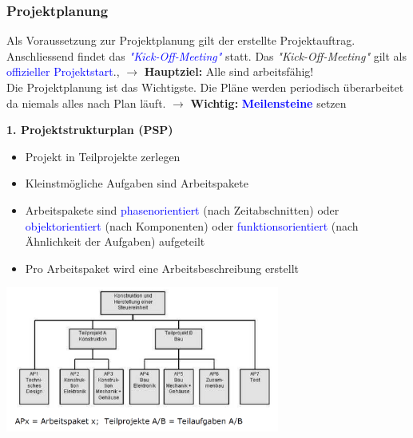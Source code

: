 \subsubsection{Projektplanung}
Als Voraussetzung zur Projektplanung gilt der erstellte Projektauftrag. Anschliessend findet das \textcolor{blue}{\textit{"Kick-Off-Meeting"}} statt. \newline Das \textit{"Kick-Off-Meeting"} gilt als \textcolor{blue}{offizieller Projektstart}., $\rightarrow$ \textbf{Hauptziel:} Alle sind arbeitsfähig!\\
Die Projektplanung ist das Wichtigste. Die Pläne werden periodisch überarbeitet da niemals alles nach Plan läuft. \newline 
$\rightarrow$ \textbf{Wichtig:} \textcolor{blue}{\textbf{Meilensteine}} setzen
\vspace{0.2cm}
\\
\begin{minipage}{10cm}
	\textbf{1. Projektstrukturplan (PSP)}
	\begin{itemize}
		\item Projekt in Teilprojekte zerlegen
		\item Kleinstmögliche Aufgaben sind Arbeitspakete
		\item Arbeitspakete sind \textcolor{blue}{phasenorientiert} (nach Zeitabschnitten) oder \textcolor{blue}{objektorientiert} (nach Komponenten) oder \textcolor{blue}{funktionsorientiert} (nach Ähnlichkeit der Aufgaben) aufgeteilt
		\item Pro Arbeitspaket wird eine Arbeitsbeschreibung erstellt
	\end{itemize} 	
\end{minipage}
\begin{minipage}{9cm}
	\includegraphics[width=9cm]{images/PSP.png}
\end{minipage}
\clearpage
\pagebreak

